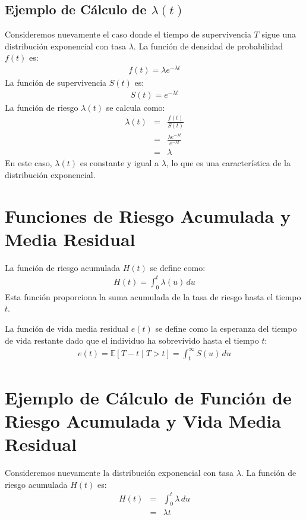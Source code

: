 \documentclass[a4paper]{report} %
\begin{document}
\subsection*{Ejemplo de C\'alculo de $\lambda(t)$}
Consideremos nuevamente el caso donde el tiempo de supervivencia $T$ sigue una distribuci\'on exponencial con tasa $\lambda$. La funci\'on de densidad de probabilidad $f(t)$ es:
\begin{eqnarray*}
f(t) = \lambda e^{-\lambda t}
\end{eqnarray*}
La funci\'on de supervivencia $S(t)$ es:
\begin{eqnarray*}
S(t) = e^{-\lambda t}
\end{eqnarray*}
La funci\'on de riesgo $\lambda(t)$ se calcula como:
\begin{eqnarray*}
\lambda(t) &=& \frac{f(t)}{S(t)} \\
           &=& \frac{\lambda e^{-\lambda t}}{e^{-\lambda t}} \\
           &=& \lambda
\end{eqnarray*}
En este caso, $\lambda(t)$ es constante y igual a $\lambda$, lo que es una caracter\'istica de la distribuci\'on exponencial.

\section*{Funciones de Riesgo Acumulada y Media Residual}
La funci\'on de riesgo acumulada $H(t)$ se define como:
\begin{eqnarray*}
H(t) = \int_0^t \lambda(u) \, du
\end{eqnarray*}
Esta funci\'on proporciona la suma acumulada de la tasa de riesgo hasta el tiempo $t$.

La funci\'on de vida media residual $e(t)$ se define como la esperanza del tiempo de vida restante dado que el individuo ha sobrevivido hasta el tiempo $t$:
\begin{eqnarray*}
e(t) = \mathbb{E}[T - t \mid T > t] = \int_t^\infty S(u) \, du
\end{eqnarray*}

\section*{Ejemplo de C\'alculo de Funci\'on de Riesgo Acumulada y Vida Media Residual}

Consideremos nuevamente la distribuci\'on exponencial con tasa $\lambda$. La funci\'on de riesgo acumulada $H(t)$ es:
\begin{eqnarray*}
H(t) &=& \int_0^t \lambda \, du \\
     &=& \lambda t
\end{eqnarray*}
\end{document}
